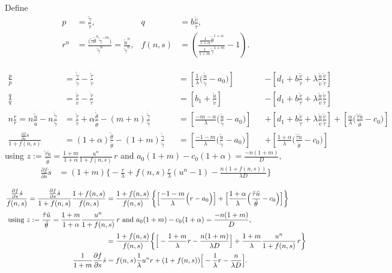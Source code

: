 \documentclass[a4paper,11pt]{article}
\def\tg{{\tilde{\gamma}}}
\def\tv{{\tilde{v}}}
\def\tth{{\tilde{\theta}}}
\def\ts{{\tilde{\tau}}}
\def\tu{{\tilde{u}}}
\def\dtg{\dot{\tilde{\gamma}}}
\def\dtv{\dot{\tilde{v}}}
\def\dtth{\dot{\tilde{\theta}}}
\def\dts{\dot{\tilde{\tau}}}
\def\dtu{\dot{\tilde{u}}}
\def\dpp{\dot{p}}
\def\dqq{\dot{q}}
\def\drr{\dot{r}}
\begin{document}
Define 
\begin{equation}\label{eq:pqrsdef}
 \begin{aligned}
  p &= \frac{\tg}{\ts}, & q&=b \frac{\tv}{\ts},\\
  r^n &= \frac{\big(\ts\tth^\alpha \tg^{-m}\big)}{\tg^n}= \frac{\tu^n}{\tg^n} , & f(n,s)&=\left(\frac{ \frac{1}{1+\alpha}\tth^{1+\alpha}}{ \frac{1}{1+m}\tg^{1+m} } -1 \right).
 \end{aligned}
\end{equation}




\begin{align*}
 \frac{\dpp}{p}&=\frac{\dtg}{\tg} - \frac{\dts}{\ts}& &=\left[\frac{1}{\lambda }\Big(\frac{\tu}{\tg}-a_0\Big)\right] & &-\left[d_1 + b\frac{\tv}{\ts} + \lambda\frac{\tu}{\tv}\frac{\tv}{\ts}\right]\\
 \frac{\dqq}{q}&=\frac{\dtv}{\tv} - \frac{\dts}{\ts}& &=\left[b_1 +\frac{\tu}{\tv}\right] & &-\left[d_1 + b\frac{\tv}{\ts} + \lambda\frac{\tu}{\tv}\frac{\tv}{\ts}\right]\\
 n\frac{\drr}{r}=n\frac{\dtu}{\tu} - n\frac{\dtg}{\tg} &= \frac{\dts}{\ts} +\alpha \frac{\dtth}{\tth} - (m+n) \frac{\dtg}{\tg}& &=\left[\frac{-m-n}{\lambda }\Big(\frac{\tu}{\tg}-a_0\Big)\right]& &+\left[d_1 + b\frac{\tv}{\ts} + \lambda\frac{\tu}{\tv}\frac{\tv}{\ts}\right]+\left[\frac{\alpha}{\lambda }\Big(\frac{\ts\tu}{\tth}-c_0\Big)\right]\\
 \frac{\frac{\partial f}{\partial s}\dot{s}}{1+f(n,s)} &= (1+\alpha)\frac{\dtth}{\tth} - (1+m)\frac{\dtg}{\tg} & &=\left[\frac{-1-m}{\lambda }\Big(\frac{\tu}{\tg}-a_0\Big)\right] & &+ \left[\frac{1+\alpha}{\lambda }\Big(\frac{\ts\tu}{\tth}-c_0\Big)\right]
\end{align*}
using $\displaystyle z:= \frac{\ts\tu}{\tth} = \frac{1+m}{1+\alpha} \frac{u^n}{1+f(n,s)}\,r$ and $\displaystyle a_0(1+m)-c_0(1+\alpha)=\frac{-n(1+m)}{D}, $
\begin{align*}
 \frac{\partial f}{\partial s}\dot{s}&=(1+m)\bigg\{-\frac{r}{\lambda} + f(n,s)\frac{r}{\lambda}  (u^n-1) - \frac{n(1+f(n,s))}{\lambda D}\bigg\}
\end{align*}


\begin{align*}
 \frac{\frac{\partial f}{\partial s}\dot{s}}{f(n,s)} = \frac{\frac{\partial f}{\partial s}\dot{s}}{1+f(n,s)} \frac{1+f(n,s)}{f(n,s)}&= \frac{1+f(n,s)}{f(n,s)}\left\{\Big[\frac{-1-m}{\lambda }\Big(r-a_0\Big)\Big] + \Big[\frac{1+\alpha}{\lambda }\Big(\frac{\ts\tu}{\tth}-c_0\Big)\Big]\right\}\\
  \intertext{ using $\displaystyle z:= \frac{\ts\tu}{\tth} = \frac{1+m}{1+\alpha} \frac{u^n}{1+f(n,s)}\,r$ and $\displaystyle a_0(1+m)-c_0(1+\alpha)=\frac{-n(1+m)}{D}, $}
  &=\frac{1+f(n,s)}{f(n,s)} \bigg\{\Big[-\frac{1+m}{\lambda }r - \frac{n(1+m)}{\lambda D}\Big] + \frac{1+m}{\lambda}\frac{u^n}{1+f(n,s)}\,r\bigg\}\\
 \frac{1}{1+m}\frac{\partial f}{\partial s}\dot{s}&=f(n,s)\frac{1}{\lambda} {u^n}r + (1+f(n,s)) \Big[-\frac{1}{\lambda }r - \frac{n}{\lambda D}\Big].
\end{align*}
\end{document}
